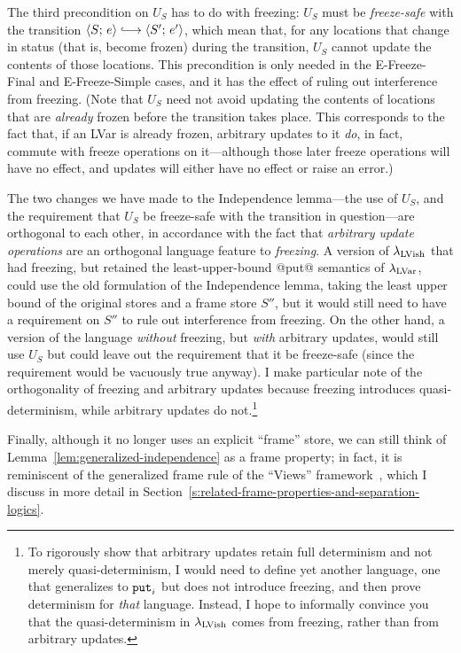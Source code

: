 The third precondition on $U_S$ has to do with freezing: $U_S$ must be
\emph{freeze-safe} with the transition $\config{S}{e} \parstepsto
\config{S'}{e'}$, which mean that, for any locations that change in
status (that is, become frozen) during the transition, $U_S$ cannot
update the contents of those locations.  This precondition is only
needed in the {\sc E-Freeze-Final} and {\sc E-Freeze-Simple} cases,
and it has the effect of ruling out interference from freezing.  (Note
that $U_S$ need not avoid updating the contents of locations that are
\emph{already} frozen before the transition takes place.  This
corresponds to the fact that, if an LVar is already frozen, arbitrary
updates to it \emph{do}, in fact, commute with freeze operations on
it---although those later freeze operations will have no effect, and
updates will either have no effect or raise an error.)

\DefFreezeSafe

The two changes we have made to the Independence lemma---the use of
$U_S$, and the requirement that $U_S$ be freeze-safe with the
transition in question---are orthogonal to each other, in accordance
with the fact that \emph{arbitrary update operations} are an
orthogonal language feature to \emph{freezing}.  A version of
$\lambda_{\textrm{LVish}}$ that had freezing, but retained the least-upper-bound
@put@ semantics of $\lambda_{\textrm{LVar}}$, could use the old formulation of the
Independence lemma, taking the least upper bound of the original
stores and a frame store $S''$, but it would still need to have a
requirement on $S''$ to rule out interference from freezing.  On the
other hand, a version of the language \emph{without} freezing, but
\emph{with} arbitrary updates, would still use $U_S$ but could leave
out the requirement that it be freeze-safe (since the requirement
would be vacuously true anyway).  I make particular note of the
orthogonality of freezing and arbitrary updates because freezing
introduces quasi-determinism, while arbitrary updates do
not.\footnote{To rigorously show that arbitrary updates retain full
  determinism and not merely quasi-determinism, I would need to define
  yet another language, one that generalizes  to $\mbox{\texttt{put}}_i$ but
  does not introduce freezing, and then prove determinism for
  \emph{that} language.  Instead, I hope to informally convince you
  that the quasi-determinism in $\lambda_{\textrm{LVish}}$ comes from freezing,
  rather than from arbitrary updates.}

Finally, although it no longer uses an explicit ``frame'' store, we
can still think of Lemma~\ref{lem:generalized-independence} as a frame
property; in fact, it is reminiscent of the generalized frame rule of
the ``Views'' framework~\cite{views}, which I discuss in more detail
in Section~\ref{s:related-frame-properties-and-separation-logics}.

